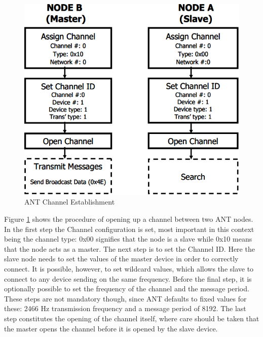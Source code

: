 \begin{figure}[H]
	\centering
	\includegraphics[scale=0.7]{./pics/ANTsetup.png}
	\caption{ANT Channel Establishment\cite{DynastreamInnovationsInc.2013}}\label{fig:antsetup}
\end{figure}

Figure \ref{fig:antsetup} shows the procedure of opening up a channel between two ANT nodes. In the first step the Channel configuration is set, most important in this context being the channel type: 0x00 signifies that the node is a slave while 0x10 means that the node acts as a master. The next step is to set the Channel ID. Here the slave node needs to set the values of the master device in order to correctly connect. It is possible, however, to set wildcard values, which allows the slave to connect to any device sending on the same frequency. Before the final step, it is optionally possible to set the frequency of the channel and the message period. These steps are not mandatory though, since ANT defaults to fixed values for these: 2466 Hz transmission frequency and a message period of 8192. The last step constitutes the opening of the channel itself, where care should be taken that the master opens the channel before it is opened by the slave device.


